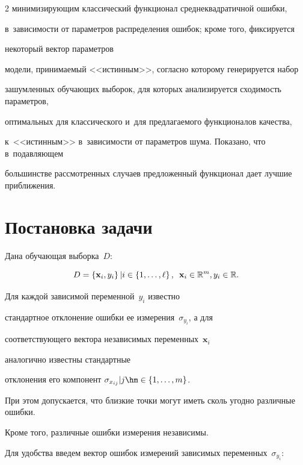 \begin{multicols}{2}
минимизирующим классический функционал среднеквадратичной ошибки,

в~зависимости от па\-ра\-мет\-ров распределения ошибок; кроме того, фиксируется 

некоторый вектор па\-ра\-мет\-ров

модели, принимаемый <<истинным>>, согласно которому генерируется набор

зашумленных обучающих выборок, для которых анализируется сходимость па\-ра\-мет\-ров,

оптимальных для классического и~для предлагаемого функционалов качества,

к~<<истинным>> в~за\-ви\-си\-мости от параметров шума. Показано, что в~подавляющем 

большинстве рассмотренных случаев предложенный функционал дает лучшие приб\-ли\-жения.



\section{Постановка задачи}



Дана обучающая выборка~$D$:

\begin{equation}

  D = \left\{ \mathbf{x}_i, y_i\right \} | i \in \{ 1, \dots, \ell \}\,,\enskip

   \mathbf{x}_i \in  \mathbb{R}^m, y_i \in \mathbb{R}.

  \label{eq:d}

\end{equation}

Для каждой зависимой переменной~$y_i$ известно

стандартное отклонение ошиб\-ки ее измерения~$\sigma_{y_i}$, а для 

соответствующего вектора независимых переменных~$\mathbf{x}_i$ 

аналогично известны стандартные

отклонения его компонент $\sigma_{x_{ij}} | j \hm\in \{ 1, \dots, m \}$.

При этом допускается, что близ\-кие точки могут иметь сколь угодно различные  ошиб\-ки.

Кроме того, различные ошиб\-ки измерения независимы.



Для удобства введем вектор ошибок измерений зависимых переменных~$\sigma_{y_i}$:


\end{multicols}
